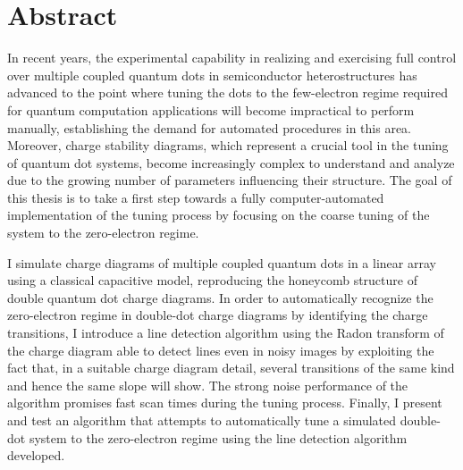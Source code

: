 \chapter*{Abstract}

In recent years, the experimental capability in realizing and exercising full
control over multiple coupled quantum dots in semiconductor heterostructures
has advanced to the point where tuning the dots to the few-electron regime
required for quantum computation applications will become impractical to
perform manually, establishing the demand for automated procedures in this
area. Moreover, charge stability diagrams, which represent a crucial tool in
the tuning of quantum dot systems, become increasingly complex to understand
and analyze due to the growing number of parameters influencing their
structure. The goal of this thesis is to take a first step towards a fully
computer-automated implementation of the tuning process by focusing on the
coarse tuning of the system to the zero-electron regime.

I simulate charge diagrams of multiple coupled quantum dots in a linear array
using a classical capacitive model, reproducing the honeycomb structure of
double quantum dot charge diagrams. In order to automatically recognize the
zero-electron regime in double-dot charge diagrams by identifying the charge
transitions, I introduce a line detection algorithm using the Radon transform
of the charge diagram able to detect lines even in noisy images by exploiting
the fact that, in a suitable charge diagram detail, several transitions of the
same kind and hence the same slope will show. The strong noise performance of
the algorithm promises fast scan times during the tuning process. Finally, I
present and test an algorithm that attempts to automatically tune a simulated
double-dot system to the zero-electron regime using the line detection
algorithm developed.